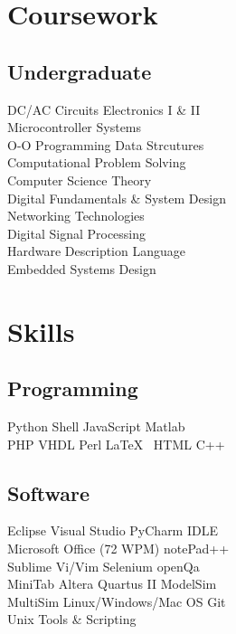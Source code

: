\documentclass[]{deedy-resume-openfont}
\begin{document}
\begin{minipage}[t]{0.33\textwidth}
\section{Coursework}
\subsection{Undergraduate}
DC/AC Circuits \textbullet{} Electronics I \& II \\
Microcontroller Systems \\
O-O Programming \textbullet{} Data Strcutures \\
Computational Problem Solving \\
Computer Science Theory \\
Digital Fundamentals \& System Design\\
Networking Technologies\\
Digital Signal Processing\\
Hardware Description Language\\
Embedded Systems Design
\sectionsep


\section{Skills}
\subsection{Programming}
Python \textbullet{} Shell \textbullet{} JavaScript \textbullet{} Matlab \\
PHP \textbullet{} VHDL \textbullet{} Perl \textbullet{} \LaTeX\ \textbullet{} HTML \textbullet{} C++
\sectionsep

\subsection{Software}
Eclipse \textbullet{} Visual Studio \textbullet{} PyCharm \textbullet{} IDLE \\ Microsoft Office (72 WPM) \textbullet{} notePad++ \\ Sublime \textbullet{} Vi/Vim \textbullet{} Selenium \textbullet{} openQa \\ MiniTab \textbullet{} Altera Quartus II \textbullet{} ModelSim \\ MultiSim \textbullet{} Linux/Windows/Mac OS \textbullet{} Git \\ Unix Tools \& Scripting
\sectionsep


\end{minipage}
\end{document}
